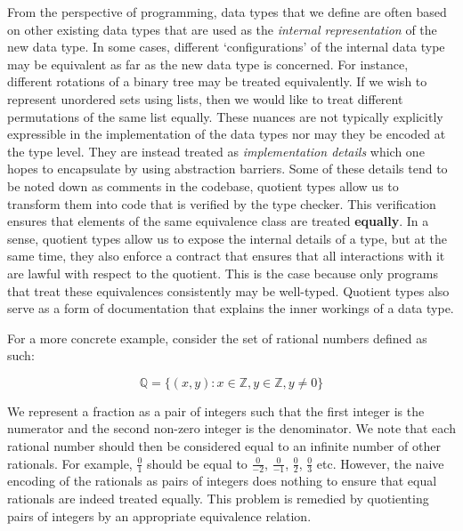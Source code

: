 \documentclass[12pt,twoside,maitrise]{dms}
\theoremstyle{definition}
\numberwithin{equation}{section}
\numberwithin{table}{chapter}
\numberwithin{figure}{chapter}
\begin{document}
From the perspective of programming, data types that we define are often based
on other existing data types that are used as the \emph{internal representation}
of the new data type. In some cases, different `configurations' of the internal
data type may be equivalent as far as the new data type is concerned. For
instance, different rotations of a binary tree may be treated equivalently. If
we wish to represent unordered sets using lists, then we would like to treat
different permutations of the same list equally. These nuances are not typically
explicitly expressible in the implementation of the data types nor may they be
encoded at the type level. They are instead treated as \emph{implementation
details} which one hopes to encapsulate by using abstraction barriers. Some of
these details tend to be noted down as comments in the codebase, quotient types
allow us to transform them into code that is verified by the type checker. This
verification ensures that elements of the same equivalence class are treated
\textbf{equally}. In a sense, quotient types allow us to expose the internal
details of a type, but at the same time, they also enforce a contract that
ensures that all interactions with it are lawful with respect to the quotient.
This is the case because only programs that treat these equivalences
consistently may be well-typed. Quotient types also serve as a form of
documentation that explains the inner workings of a data type.

For a more concrete example, consider the set of rational numbers defined as
such:

\begin{equation}
\mathbb{Q} = \{(x,y) : x \in \mathbb{Z}, y \in \mathbb{Z}, y \ne 0\}
\end{equation}

We represent a fraction as a pair of integers such that the first integer is the
numerator and the second non-zero integer is the denominator. We note that each
rational number should then be considered equal to an infinite number of other
rationals. For example, $\frac{0}{1}$ should be equal to $\frac{0}{-2}$,
$\frac{0}{-1}$, $\frac{0}{2}$, $\frac{0}{3}$ etc. However, the naive encoding of
the rationals as pairs of integers does nothing to ensure that equal rationals
are indeed treated equally. This problem is remedied by quotienting pairs of
integers by an appropriate equivalence relation.
\end{document}
